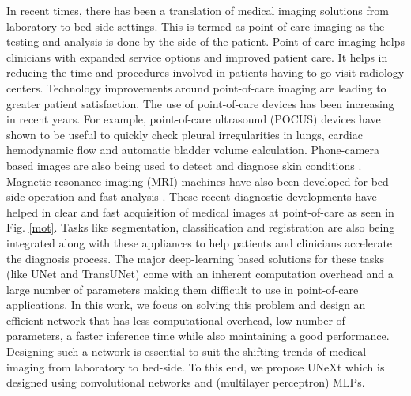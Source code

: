 \documentclass[runningheads]{llncs}
\begin{document}
In recent times, there has been a translation of medical imaging solutions from laboratory to bed-side settings. This is termed as point-of-care imaging as the testing and analysis is done by the side of the patient. Point-of-care imaging \cite{vashist2017point} helps clinicians with expanded service options and improved patient care. It helps in reducing the time and procedures involved in patients having to go visit radiology centers. Technology improvements around point-of-care imaging are leading to greater patient satisfaction.  The use of point-of-care devices has been increasing in recent years. For example,  point-of-care ultrasound (POCUS) devices \cite{pocus} have shown to be useful to quickly check  pleural irregularities in lungs, cardiac hemodynamic flow and automatic bladder volume calculation. Phone-camera based images are also being used to detect and diagnose skin conditions \cite{derm}. Magnetic resonance imaging (MRI) machines have also been developed for bed-side operation and fast analysis \cite{mri}.  These recent diagnostic developments have helped in clear and fast acquisition of medical images at point-of-care as seen in Fig. \ref{mot}. Tasks like segmentation, classification and registration are also being integrated along with these appliances to help patients and clinicians accelerate the diagnosis process. The major deep-learning based solutions for these tasks (like UNet and TransUNet) come with an inherent computation overhead and a large number of parameters making them difficult to use in point-of-care applications. In this work, we focus on solving this problem and design an efficient network that has less computational overhead, low number of parameters, a faster inference time while also maintaining a good performance. Designing such a network is essential to suit the shifting trends of medical imaging from laboratory to bed-side. To this end, we propose UNeXt which is designed using convolutional networks and (multilayer perceptron) MLPs.
\end{document}
